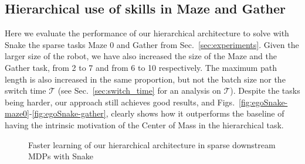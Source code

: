 \documentclass{article} %
\begin{document}
\subsection{Hierarchical use of skills in Maze and Gather}
\label{sec:snake-hierarchy}
Here we evaluate the performance of our hierarchical architecture to solve with Snake the sparse tasks Maze 0 and Gather from Sec.\ \ref{sec:experiments}. Given the larger size of the robot, we have also increased the size of the Maze and the Gather task, from 2 to 7 and from 6 to 10 respectively. The maximum path length is also increased in the same proportion, but not the batch size nor the switch time $\mathcal{T}$ (see Sec.\ \ref{sec:switch_time} for an analysis on $\mathcal{T}$). Despite the tasks being harder, our approach still achieves good results, and Figs.\ \ref{fig:egoSnake-maze0}-\ref{fig:egoSnake-gather}, clearly shows how it outperforms the baseline of having the intrinsic motivation of the Center of Mass in the hierarchical task.

\begin{figure}[h!]
	\centering
	\caption{Faster learning of our hierarchical architecture in sparse downstream MDPs with Snake}
	\label{fig:egoSnake-learning-curves}
\end{figure}
\end{document}
